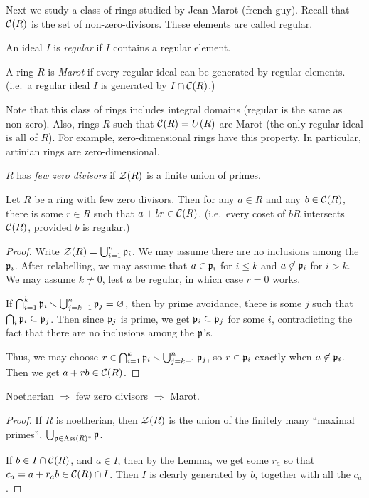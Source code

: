  Next we study a class of rings studied by Jean Marot (french guy). Recall that $\mathcal{C}(R)$
 is the set of non-zero-divisors. These elements are called regular.
 \begin{definition}
   An ideal $I$ is \emph{regular} if $I$ contains a regular element.
 \end{definition}
 \begin{definition}
   A ring $R$ is \emph{Marot} if every regular ideal can be
   generated by regular elements. (i.e.\ a regular ideal $I$ is generated by $I\cap
   \mathcal{C}(R)$.)
 \end{definition}
 Note that this class of rings includes integral domains (regular is the same as
 non-zero). Also, rings $R$ such that $\mathcal{C}(R)= U(R)$ are Marot (the only regular ideal is
 all of $R$). For example, zero-dimensional rings have this property. In particular,
 artinian rings are zero-dimensional.
 \begin{definition}
   $R$ has \emph{few zero divisors} if $\mathcal{Z}(R)$ is a \underline{finite} union of primes.
 \end{definition}
 \begin{lemma}
   Let $R$ be a ring with few zero divisors. Then for any $a\in R$ and any $b\in \mathcal{C}(R)$,
   there is some $r\in R$ such that $a+br\in \mathcal{C}(R)$. (i.e.\ every coset of $bR$ intersects
   $\mathcal{C}(R)$, provided $b$ is regular.)
 \end{lemma}
 \begin{proof}
   Write $\mathcal{Z}(R)=\bigcup_{i=1}^n \mathfrak{p}_i$. We may assume there are no inclusions among the
   $\mathfrak{p}_i$. After relabelling, we may assume that $a\in \mathfrak{p}_i$ for $i\le k$ and $a\not\in
   \mathfrak{p}_i$ for $i>k$. We may assume $k\neq 0$, lest $a$ be regular, in which case $r=0$
   works.

   If $\bigcap_{i=1}^k\mathfrak{p}_i\smallsetminus \bigcup_{j=k+1}^n \mathfrak{p}_j=\varnothing$, then by
   prime avoidance, there is some $j$ such that $\bigcap_i\mathfrak{p}_i\subseteq \mathfrak{p}_j$. Then since
   $\mathfrak{p}_j$ is prime, we get $\mathfrak{p}_i\subseteq \mathfrak{p}_j$ for some $i$, contradicting the fact that
   there are no inclusions among the $\mathfrak{p}$'s.

   Thus, we may choose $r\in \bigcap_{i=1}^k\mathfrak{p}_i\smallsetminus \bigcup_{j=k+1}^n \mathfrak{p}_j$,
   so $r\in \mathfrak{p}_i$ exactly when $a\not\in \mathfrak{p}_i$. Then we get $a+rb\in \mathcal{C}(R)$.
 \end{proof}
 \begin{theorem}
   Noetherian $\Rightarrow$ few zero divisors $\Rightarrow$ Marot.
 \end{theorem}
 \begin{proof}
   If $R$ is noetherian, then $\mathcal{Z}(R)$ is the union of the finitely many ``maximal
   primes'', $\bigcup_{\mathfrak{p}\in \operatorname{Ass}(R)^*} \mathfrak{p}$.

   If $b\in I\cap \mathcal{C}(R)$, and $a\in I$, then by the Lemma, we get some $r_a$ so that
   $c_a=a+r_ab\in \mathcal{C}(R)\cap I$. Then $I$ is clearly generated by $b$, together with all
   the $c_a$.
 \end{proof}
